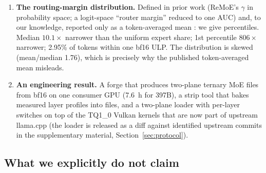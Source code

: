 \documentclass[10pt]{article} %
\begin{document}
\begin{enumerate}
   trials, identical server, reasoning off), the shipped file resolves 78.3\%
   against 55.2\% for a slightly \emph{smaller} IQ1\_M quantization of the
   same model (85.1 vs.\ 88.2~GiB; the size handicap favours the baseline)
   (discordant pairs 39--6, exact McNemar $p = 5.4\times 10^{-7}$; paired
   bootstrap CI$_{95}$ of the difference $[+14.7, +31.5]$ points). With
   reasoning \emph{on}, the ranking inverts: the GPTQ-calibrated planes
   degenerate into termination-token loops while an RTN forge at the same
   bit-rate passes every reasoning probe --- a dissociation between
   quantization algorithms that neither perplexity nor no-think task rate
   detects (Section~\ref{sec:tasks}).
\item \textbf{The routing-margin distribution.} Defined in prior work (ReMoE's
   $\gamma$ in probability space; a logit-space ``router margin'' reduced to one AUC)
   and, to our knowledge, reported only as a token-averaged mean
   \citep{chen2026certainhead}: we give percentiles. Median $10.1\times$ narrower than the
   uniform expert share; 1st percentile $806\times$ narrower; 2.95\% of tokens
   within one bf16 ULP. The distribution is skewed (mean/median 1.76), which
   is precisely why the published token-averaged mean misleads.
\item \textbf{An engineering result.} A forge that produces two-plane
   ternary MoE files from bf16 on one consumer GPU (7.6~h for 397B), a strip
   tool that bakes measured layer profiles into files, and a two-plane loader
   with per-layer switches on top of the TQ1\_0 Vulkan kernels that are now
   part of upstream llama.cpp (the loader is released as a diff against
   identified upstream commits in the supplementary material,
   Section~\ref{sec:protocol}).
\end{enumerate}

\subsection{What we explicitly do not claim}
\end{document}
